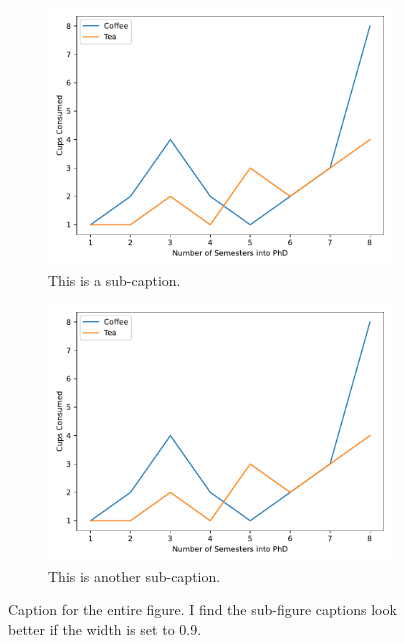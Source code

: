 \begin{figure}
\centering
\begin{subfigure}{0.45\textwidth}
  \centering
  \captionsetup{width=0.9\linewidth}
  \includegraphics[width=1\linewidth]{Figures/Figure_1.pdf}
  \caption{This is a sub-caption.}
  \label{subfig:a}
\end{subfigure}
\begin{subfigure}{0.45\textwidth}
  \centering
  \captionsetup{width=0.9\linewidth}
  \includegraphics[width=1\linewidth]{Figures/Figure_1.pdf}
  \caption{This is another sub-caption.}
  \label{subfig:b}
\end{subfigure}
\caption{Caption for the entire figure.  I find the sub-figure captions look better if the width is set to 0.9.}
\label{fig:subfigs}
\end{figure}

